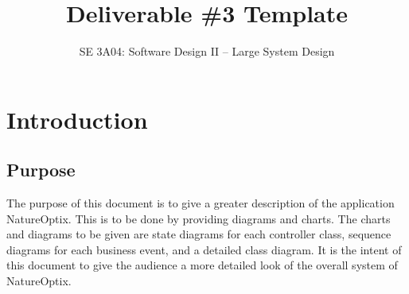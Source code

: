 \documentclass[]{article}
\title{Deliverable \#3 Template}
\author{SE 3A04: Software Design II -- Large System Design}
\date{}
\begin{document}
\maketitle	

\section{Introduction}
\label{sec:introduction}


\subsection{Purpose}
\label{sub:purpose}
The purpose of this document is to give a greater description of the application NatureOptix. This is to be done by providing diagrams and charts. The charts and diagrams to be given are state diagrams for each controller class, sequence diagrams for each business event, and a detailed class diagram. It is the intent of this document to give the audience a more detailed look of the overall system of NatureOptix. 
\end{document}

